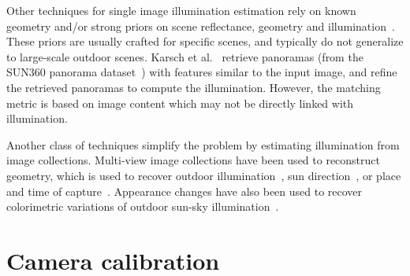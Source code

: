 Other techniques for single image illumination estimation rely on known geometry and/or strong priors on scene reflectance, geometry and illumination~\cite{barron-pami-15,barron2013rgbd,lombardi2016reflectance}. These priors are usually crafted for specific scenes, and typically do not generalize to large-scale outdoor scenes. Karsch et al.~\cite{karsch2014automatic} retrieve panoramas (from the SUN360 panorama dataset~\cite{xiao-cvpr-12}) with features similar to the input image, and refine the retrieved panoramas to compute the illumination. However, the matching metric is based on image content which may not be directly linked with illumination. 

Another class of techniques simplify the problem by estimating illumination from image collections. Multi-view image collections have been used to reconstruct geometry, which is used to recover outdoor illumination~\cite{haber2009relighting,lalonde-3dv-14,shan2015visual,duchene2015multiview}, sun direction~\cite{wehrwein2015shadows}, or place and time of capture~\cite{hauagge2014outdoor}. Appearance changes have also been used to recover colorimetric variations of outdoor sun-sky illumination~\cite{sunkavalli2008color}. 





\section{Camera calibration}

